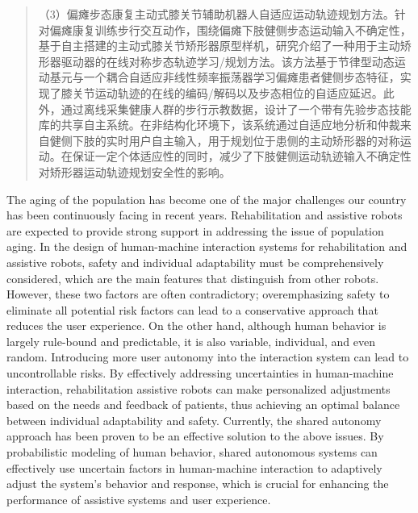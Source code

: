 \begin{abstract}
（3）偏瘫步态康复主动式膝关节辅助机器人自适应运动轨迹规划方法。针对偏瘫康复训练步行交互动作，围绕偏瘫下肢健侧步态运动输入不确定性，基于自主搭建的主动式膝关节矫形器原型样机，研究介绍了一种用于主动矫形器驱动器的在线对称步态轨迹学习/规划方法。该方法基于节律型动态运动基元与一个耦合自适应非线性频率振荡器学习偏瘫患者健侧步态特征，实现了膝关节运动轨迹的在线的编码/解码以及步态相位的自适应延迟。此外，通过离线采集健康人群的步行示教数据，设计了一个带有先验步态技能库的共享自主系统。在非结构化环境下，该系统通过自适应地分析和仲裁来自健侧下肢的实时用户自主输入，用于规划位于患侧的主动矫形器的对称运动。在保证一定个体适应性的同时，减少了下肢健侧运动轨迹输入不确定性对矫形器运动轨迹规划安全性的影响。

\end{abstract}

\begin{abstract*}
The aging of the population has become one of the major challenges our country has been continuously facing in recent years. Rehabilitation and assistive robots are expected to provide strong support in addressing the issue of population aging. In the design of human-machine interaction systems for rehabilitation and assistive robots, safety and individual adaptability must be comprehensively considered, which are the main features that distinguish from other robots. However, these two factors are often contradictory; overemphasizing safety to eliminate all potential risk factors can lead to a conservative approach that reduces the user experience. On the other hand, although human behavior is largely rule-bound and predictable, it is also variable, individual, and even random. Introducing more user autonomy into the interaction system can lead to uncontrollable risks. By effectively addressing uncertainties in human-machine interaction, rehabilitation assistive robots can make personalized adjustments based on the needs and feedback of patients, thus achieving an optimal balance between individual adaptability and safety. Currently, the shared autonomy approach has been proven to be an effective solution to the above issues. By probabilistic modeling of human behavior, shared autonomous systems can effectively use uncertain factors in human-machine interaction to adaptively adjust the system's behavior and response, which is crucial for enhancing the performance of assistive systems and user experience. 


\end{abstract*}
